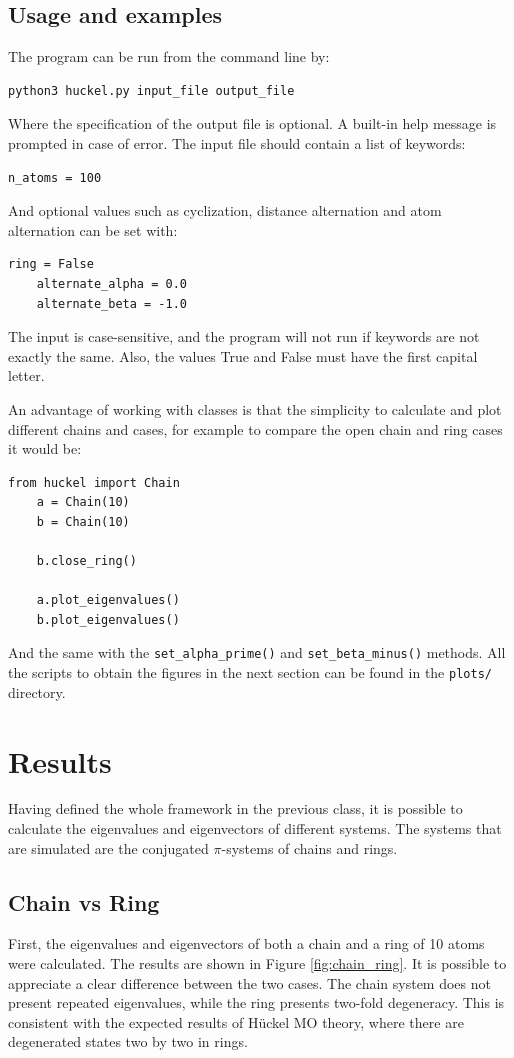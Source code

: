 \documentclass[twocolumn]{article}
\begin{document}
\subsection{Usage and examples}
The program can be run from the command line by:
\begin{lstlisting}[backgroundcolor=\color{LightGray}]
    python3 huckel.py input_file output_file
\end{lstlisting} 
Where the specification of the output file is optional. A built-in help message is prompted in case of error. The input file should contain a list of keywords:

\begin{lstlisting}[backgroundcolor=\color{LightGray}]
    n_atoms = 100
\end{lstlisting} 
And optional values such as cyclization, distance alternation and atom alternation can be set with:
\begin{lstlisting}[backgroundcolor=\color{LightGray}]
    ring = False
    alternate_alpha = 0.0
    alternate_beta = -1.0
\end{lstlisting} 
The input is case-sensitive, and the program will not run if keywords are not exactly the same. Also, the values True and False must have the first capital letter.

An advantage of working with classes is that the simplicity to calculate and plot different chains and cases, for example to compare the open chain and ring cases it would be:
\begin{lstlisting}[backgroundcolor=\color{LightGray}]
    from huckel import Chain
    a = Chain(10)
    b = Chain(10)
    
    b.close_ring()
    
    a.plot_eigenvalues()
    b.plot_eigenvalues()
\end{lstlisting} 
And the same with the  \texttt{set\_alpha\_prime()} and \texttt{set\_beta\_minus()} methods. All the scripts to obtain the figures in the next section can be found in the \texttt{plots/} directory. 

\section{Results}
Having defined the whole framework in the previous class, it is possible to calculate the eigenvalues and eigenvectors of different systems. The systems that are simulated are the conjugated $\pi$-systems of chains and rings. 

\subsection{Chain vs Ring}
First, the eigenvalues and eigenvectors of both a chain and a ring of 10 atoms were calculated. The results are shown in Figure \ref{fig:chain_ring}. It is possible to appreciate a clear difference between the two cases. The chain system does not present repeated eigenvalues, while the ring presents two-fold degeneracy. This is consistent with the expected results of Hückel MO theory, where there are degenerated states two by two in rings. 
\end{document}
